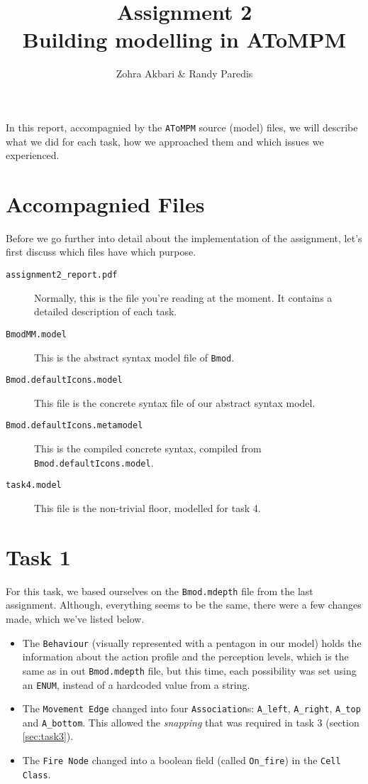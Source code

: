 \documentclass[11pt]{article}
\begin{document}
\title{Assignment 2\\Building modelling in AToMPM}
\author{Zohra Akbari \& Randy Paredis}
\date{}
\maketitle

In this report, accompagnied by the \texttt{AToMPM} source (model) files, we will describe what we did for each task, how we approached them and which issues we experienced.

\section{Accompagnied Files}
Before we go further into detail about the implementation of the assignment, let's first discuss which files have which purpose.
\begin{description}
	\item[\texttt{assignment2\_report.pdf}] Normally, this is the file you're reading at the moment. It contains a detailed description of each task.
	
	\item[\texttt{BmodMM.model}] This is the abstract syntax model file of \texttt{Bmod}.
	
	\item[\texttt{Bmod.defaultIcons.model}] This file is the concrete syntax file of our abstract syntax model.
	
	\item[\texttt{Bmod.defaultIcons.metamodel}] This is the compiled concrete syntax, compiled from \texttt{Bmod.defaultIcons.model}.
	
	\item[\texttt{task4.model}] This file is the non-trivial floor, modelled for task 4.
\end{description}

\section{Task 1}
For this task, we based ourselves on the \texttt{Bmod.mdepth} file from the last assignment. Although, everything seems to be the same, there were a few changes made, which we've listed below.
\begin{itemize}
	\item The \texttt{Behaviour} (visually represented with a pentagon in our model) holds the information about the action profile and the perception levels, which is the same as in out \texttt{Bmod.mdepth} file, but this time, each possibility was set using an \texttt{ENUM}, instead of a hardcoded value from a string.
	\item The \texttt{Movement Edge} changed into four \texttt{Association}s: \texttt{A\_left}, \texttt{A\_right}, \texttt{A\_top} and \texttt{A\_bottom}. This allowed the \textit{snapping} that was required in task 3 (section \ref{sec:task3}).
	\item The \texttt{Fire Node} changed into a boolean field (called \texttt{On\_fire}) in the \texttt{Cell Class}.
\end{itemize}
\end{document}
